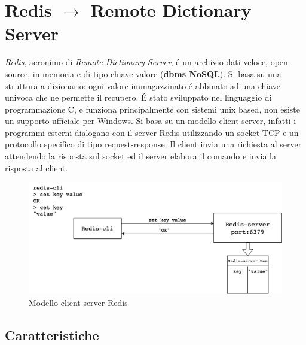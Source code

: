 \chapter{Redis $\to$ Remote Dictionary Server}

\emph{Redis}, acronimo di \emph{Remote Dictionary Server}, é un archivio dati veloce, open source, in memoria e di tipo chiave-valore (\textbf{dbms NoSQL}).
Si basa su una struttura a dizionario: ogni valore immagazzinato é abbinato ad una chiave univoca che ne permette il recupero.
É stato sviluppato nel linguaggio di programmazione C, e funziona principalmente con sistemi unix based, non esiste un supporto ufficiale
per Windows.
Si basa su un modello client-server, infatti i programmi esterni dialogano con il server Redis utilizzando un socket TCP e un protocollo specifico
di tipo request-response.
Il client invia una richiesta al server attendendo la risposta sul socket ed il server elabora il comando e
invia la risposta al client.

\begin{figure}[H]
    \begin{center}
        \includegraphics[width=1\textwidth]{img/redisClientServer}
    \end{center}
\caption{Modello client-server Redis}
\end{figure}

\section{Caratteristiche}
